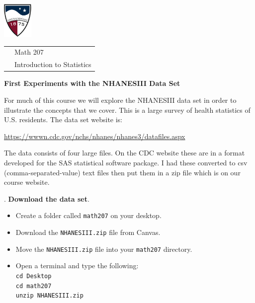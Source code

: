 \documentclass[10pt]{article}
\newcounter{EX}\setcounter{EX}{1}
\newcommand{\EXERCISE}{\arabic{EX}.\stepcounter{EX} }
\begin{document}
\pagestyle{empty}
\lstset{language=R, showspaces=false, showstringspaces=false}

\href{http://www.su.edu}{\includegraphics[height=1.75cm]{sulogo.eps}}
\vspace{-1.69cm}

{\small \hfill
\begin{tabular}{cl}
& Math 207\\& Introduction to Statistics\\
\end{tabular}
}
\setlength{\baselineskip}{1.05\baselineskip}
\medskip
\medskip

\begin{center}
\textbf{\large  First Experiments with the NHANESIII Data Set}
\end{center}

\newcommand{\SUBX}{\smallskip\hspace{10pt}}
\newcommand{\BSK}{\vspace{.14in}}

For much of this course we will explore the NHANESIII data set
in order to illustrate the concepts that we cover.  This is a large survey of
health statistics of U.S. residents.  The data set website is:\vspace{-8pt}
\begin{center}
\href{https://wwwn.cdc.gov/nchs/nhanes/nhanes3/datafiles.aspx}{https://wwwn.cdc.gov/nchs/nhanes/nhanes3/datafiles.aspx}\vspace{-8pt}
\end{center}
The data consists of four large files.  On the CDC website these are in a format 
developed for the SAS statistical software package.  I had these converted to 
csv (comma-separated-value) text files then put them in a zip file which is on our course website.

\EXERCISE \textbf{Download the data set}.
\begin{itemize}
\item Create a folder called \texttt{math207} on your desktop.
\item Download the \texttt{NHANESIII.zip} file from Canvas.
\item Move the \texttt{NHANESIII.zip} file into your \texttt{math207} directory.
\item Open a terminal and type the following:\\
  \texttt{cd  Desktop}\\
  \texttt{cd  math207}\\
  \texttt{unzip  NHANESIII.zip}
\end{itemize}
\end{document}

